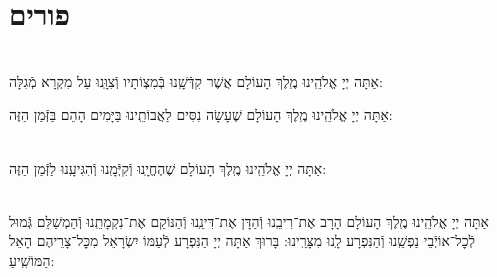 \documentclass[twoside, openany, parskip=half, 11pt]{book}
\begin{document}
\vfill
\sepline

\chapter[פורים]{ פורים }

\label{purim}

\\
אַתָּה יְיָ אֱלֹהֵֽינוּ מֶֽלֶךְ הָעוֹלָם
אֲשֶׁר קִדְּֿשָֽׁנוּ בְּֿמִצְוֹתָיו וְֿצִוָּֽנוּ עַל מִקְרָא מְֿגִלָּה:


אַתָּה יְיָ אֱלֹהֵֽינוּ מֶֽלֶךְ הָעוֹלָם שֶׁעָשָׂה נִסִּים לַאֲבוֹתֵֽינוּ בַּיָּמִים הָהֵם בַּזְּֿמַן הַזֶּה:

\\
אַתָּה יְיָ אֱלֹהֵֽינוּ מֶֽלֶךְ הָעוֹלָם שֶׁהֶחֱיָֽנוּ וְֿקִיְּֿמָֽנוּ וְֿהִגִּיעָֽנוּ לַזְּֿמַן הַזֶּה:


 \\
אַתָּה יְיָ אֱלֹהֵֽינוּ מֶֽלֶךְ הָעוֹלָם הָרָב אֶת־רִיבֵֽנוּ וְֿהַדָּן אֶת־דִּינֵֽנוּ וְֿהַנּוֹקֵם אֶת־נִקְמָתֵֽנוּ וְֿהַמְשַׁלֵּם גְּֿמוּל לְֿכׇל־אוֹיְֿבֵי נַפְשֵֽׁנוּ וְֿהַנִּפְרָע לָֽנוּ מִצָּרֵֽינוּ: בָּרוּךְ אַתָּה יְיָ הַנִּפְרָע לְֿעַמּוֹ יִשְׂרָאֵל מִכׇּל־צָרֵיהֶם הָאֵל הַמּוֹשִֽׁיעַ:

\end{document}
